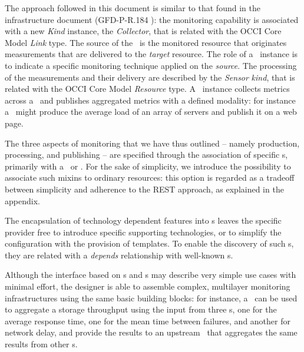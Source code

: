 \documentclass[10pt,a4paper]{article}
\begin{document}
The approach followed in this document is similar to that found in the infrastructure document (GFD-P-R.184 \cite{occi:infrastructure}): the monitoring capability is associated with a new {\em Kind} instance, the {\em Collector}, that is related with the OCCI Core Model {\em Link} type. The source of the \coll\ is the monitored resource that originates measurements that are delivered to the {\em target} resource. The role of a \coll\ instance is to indicate a specific monitoring technique applied on the {\em source}. The processing of the measurements and their delivery are described by the {\em Sensor} {\em kind}, that is related with the OCCI Core Model {\em Resource} type. A \sens\ instance collects metrics across a \coll\ and publishes aggregated metrics with a defined modality: for instance a \sens\ might produce the average load of an array of servers and publish it on a web page.

The three aspects of monitoring that we have thus outlined -- namely production, processing, and publishing -- are specified through the association of specific \mi s, primarily with a \sens\ or \coll. For the sake of simplicity, we introduce the possibility to associate such mixins to ordinary resources: this option is regarded as a tradeoff between simplicity and adherence to the REST approach, as explained in the appendix.

The encapsulation of technology dependent features into \mi s leaves the specific provider free to introduce specific supporting technologies, or to simplify the configuration with the provision of templates. To enable the discovery of such \mi s, they are related with a {\em depends} relationship with well-known \mi s.



Although the interface based on \sens s and \coll s may describe very simple use cases with minimal effort, the designer is able to assemble complex, multilayer monitoring infrastructures using the same basic building blocks: for instance, a \sens\ can be used to aggregate a storage throughput using the input from three \coll s, one for the average response time, one for the mean time between failures, and another for network delay, and provide the results to an upstream \sens\ that aggregates the same results from other \sens s.
\end{document}

